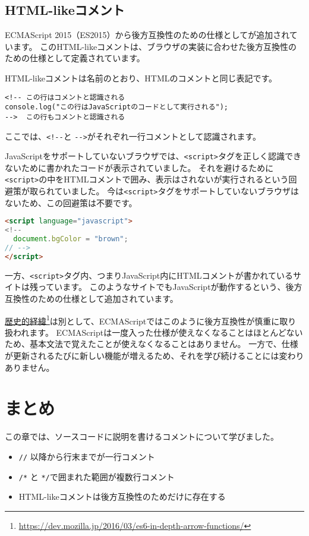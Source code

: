 \hypertarget{html-like-comment}{%
\subsection[HTML-likeコメント]{HTML-likeコメント\,\protect{}}\label{html-like-comment}}

ECMAScript
2015（ES2015）から後方互換性のための仕様として\textbf{}が追加されています。
このHTML-likeコメントは、ブラウザの実装に合わせた後方互換性のための仕様として定義されています。

HTML-likeコメントは名前のとおり、HTMLのコメントと同じ表記です。

\begin{lstlisting}
<!-- この行はコメントと認識される
console.log("この行はJavaScriptのコードとして実行される");
-->  この行もコメントと認識される
\end{lstlisting}

ここでは、\verb|<!--|と
\verb|-->|がそれぞれ一行コメントとして認識されます。

JavaScriptをサポートしていないブラウザでは、\texttt{<script>}タグを正しく認識できないために書かれたコードが表示されていました。
それを避けるために\texttt{<script>}の中をHTMLコメントで囲み、表示はされないが実行されるという回避策が取られていました。
今は\texttt{<script>}タグをサポートしていないブラウザはないため、この回避策は不要です。

\begin{lstlisting}[language=HTML]
<script language="javascript">
<!--
  document.bgColor = "brown";
// -->
</script>
\end{lstlisting}

一方、\texttt{<script>}タグ内、つまりJavaScript内にHTMLコメントが書かれているサイトは残っています。
このようなサイトでもJavaScriptが動作するという、後方互換性のための仕様として追加されています。

\href{https://dev.mozilla.jp/2016/03/es6-in-depth-arrow-functions/}{歴史的経緯}\footnote{\url{https://dev.mozilla.jp/2016/03/es6-in-depth-arrow-functions/}}は別として、ECMAScriptではこのように後方互換性が慎重に取り扱われます。
ECMAScriptは一度入った仕様が使えなくなることはほとんどないため、基本文法で覚えたことが使えなくなることはありません。
一方で、仕様が更新されるたびに新しい機能が増えるため、それを学び続けることには変わりありません。

\hypertarget{conclusion}{%
\section{まとめ}\label{conclusion}}

この章では、ソースコードに説明を書けるコメントについて学びました。

\begin{itemize}
\item
  \texttt{//} 以降から行末までが一行コメント
\item
  \texttt{/*} と
  \texttt{*/}で囲まれた範囲が複数行コメント
\item
  HTML-likeコメントは後方互換性のためだけに存在する
\end{itemize}
